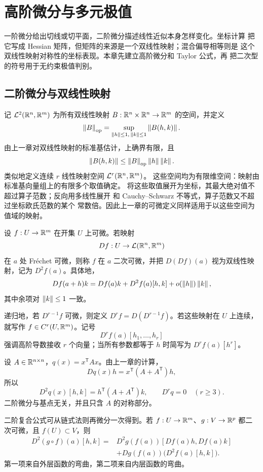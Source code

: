\chapter{高阶微分与多元极值}
\label{chap:higher-differentials-extrema}

一阶微分给出切线或切平面，二阶微分描述线性近似本身怎样变化。坐标计算
把它写成 Hessian 矩阵，但矩阵的来源是一个双线性映射；混合偏导相等则是
这个双线性映射对称性的坐标表现。本章先建立高阶微分和 Taylor 公式，再
把二次型的符号用于无约束极值判别。

\section{二阶微分与双线性映射}

记 \(\mathcal L^2(\mathbb{R}^n,\mathbb{R}^m)\) 为所有双线性映射
\(B:\mathbb{R}^n\times\mathbb{R}^n\to\mathbb{R}^m\) 的空间，并定义
\[
 \left\lVert B\right\rVert_{\mathrm{op}}
 =\sup_{\left\lVert h\right\rVert\le1,\,\left\lVert k\right\rVert\le1}\left\lVert B(h,k)\right\rVert.
\]
由上一章对双线性映射的标准基估计，上确界有限，且
\[
 \left\lVert B(h,k)\right\rVert\le\left\lVert B\right\rVert_{\mathrm{op}}\left\lVert h\right\rVert\left\lVert k\right\rVert.
\]
类似地定义连续 \(r\) 线性映射空间 \(\mathcal L^r(\mathbb{R}^n,\mathbb{R}^m)\)。
这些空间均为有限维空间：映射由标准基向量组上的有限多个取值确定。
将这些取值展开为坐标，其最大绝对值不超过算子范数；反向用多线性展开
和 Cauchy--Schwarz 不等式，算子范数又不超过坐标欧氏范数的某个
常数倍。因此上一章的可微定义同样适用于以这些空间为值域的映射。

设 \(f:U\to\mathbb{R}^m\) 在开集 \(U\) 上可微。若映射
\[
 Df:U\to\mathcal L(\mathbb{R}^n,\mathbb{R}^m)
\]
在 \(a\) 处 Fréchet 可微，则称 \(f\) 在 \(a\) 二次可微，并把
\(D(Df)(a)\) 视为双线性映射，记为 \(D^2f(a)\)。具体地，
\[
 Df(a+h)k
 =Df(a)k+D^2f(a)[h,k]+o(\left\lVert h\right\rVert)\left\lVert k\right\rVert,
\]
其中余项对 \(\left\lVert k\right\rVert\le1\) 一致。

递归地，若 \(D^{r-1}f\) 可微，则定义
\(D^rf=D(D^{r-1}f)\)。若这些映射在 \(U\) 上连续，就写作
\(f\in C^r(U,\mathbb{R}^m)\)。记号
\[
 D^rf(a)[h_1,\ldots,h_r]
\]
强调高阶导数接收 \(r\) 个向量；当所有参数都等于 \(h\) 时简写为
\(D^rf(a)[h^r]\)。

\begin{example}[二次映射]
设 \(A\in\mathbb{R}^{n\times n}\)，\(q(x)=x^{\mathsf T}Ax\)。由上一章的计算，
\[
 Dq(x)h=x^{\mathsf T}(A+A^{\mathsf T})h,
\]
所以
\[
 D^2q(x)[h,k]=h^{\mathsf T}(A+A^{\mathsf T})k,
\qquad D^rq=0\quad(r\ge3).
\]
二阶微分与基点无关，并且只含 \(A\) 的对称部分。
\end{example}

二阶复合公式可从链式法则再微分一次得到。若
\(f:U\to\mathbb{R}^m\)、\(g:V\to\mathbb{R}^p\) 都二次可微，且 \(f(U)\subset V\)，则
\[
 \begin{split}
 D^2(g\circ f)(a)[h,k]
 ={}&D^2g(f(a))[Df(a)h,Df(a)k]\\
 &+Dg(f(a))\bigl(D^2f(a)[h,k]\bigr).
 \end{split}
\]
第一项来自外层函数的弯曲，第二项来自内层函数的弯曲。

